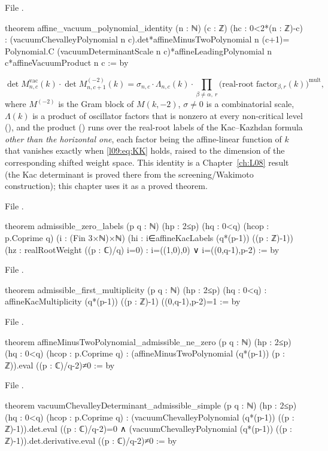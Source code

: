 \noindent File .
\begin{leancode}
theorem affine_vacuum_polynomial_identity (n : ℕ) (c : ℤ)
    (hc : 0<2*(n : ℤ)-c) :
    (vacuumChevalleyPolynomial n c).det*affineMinusTwoPolynomial n (c+1)=
      Polynomial.C (vacuumDeterminantScale n c)*affineLeadingPolynomial n c*affineVacuumProduct n c := by
\end{leancode}
\begin{equation}\label{l09:eq:detidentity}
  \det M^{\mathrm{vac}}_{n,c}(k)\cdot \det M^{(-2)}_{n,c+1}(k)
  = \sigma_{n,c}\cdot \Lambda_{n,c}(k)\cdot \prod_{\beta\ne\alpha,\ r}\bigl(\text{real-root factor}_{\beta,r}(k)\bigr)^{\mathrm{mult}} ,
\end{equation}
where $M^{(-2)}$ is the Gram block of $M(k,-2)$, $\sigma\neq0$ is a combinatorial scale, $\Lambda(k)$ is a
product of oscillator factors that is nonzero at every non-critical level
(), and the product () runs over
the real-root labels of the Kac--Kazhdan formula \emph{other than the horizontal one}, each factor
being the affine-linear function of $k$ that vanishes exactly when \eqref{l09:eq:KK} holds, raised to
the dimension of the corresponding shifted weight space. This identity is a Chapter~\ref{ch:L08}
result (the Kac determinant is proved there from the screening/Wakimoto construction); this chapter
uses it as a proved theorem.

\noindent File .
\begin{leancode}
theorem admissible_zero_labels (p q : ℕ) (hp : 2≤p) (hq : 0<q)
    (hcop : p.Coprime q) (i : (Fin 3×ℕ)×ℕ)
    (hi : i∈affineKacLabels (q*(p-1)) ((p : ℤ)-1))
    (hz : realRootWeight ((p : ℂ)/q) i=0) :
    i=((1,0),0) ∨ i=((0,q-1),p-2) := by
\end{leancode}
\noindent File .
\begin{leancode}
theorem admissible_first_multiplicity (p q : ℕ) (hp : 2≤p) (hq : 0<q) :
    affineKacMultiplicity (q*(p-1)) ((p : ℤ)-1) ((0,q-1),p-2)=1 := by
\end{leancode}
\noindent File .
\begin{leancode}
theorem affineMinusTwoPolynomial_admissible_ne_zero (p q : ℕ) (hp : 2≤p) (hq : 0<q)
    (hcop : p.Coprime q) :
    (affineMinusTwoPolynomial (q*(p-1)) (p : ℤ)).eval ((p : ℂ)/q-2)≠0 := by
\end{leancode}
\noindent File .
\begin{leancode}
theorem vacuumChevalleyDeterminant_admissible_simple (p q : ℕ) (hp : 2≤p) (hq : 0<q)
    (hcop : p.Coprime q) :
    (vacuumChevalleyPolynomial (q*(p-1)) ((p : ℤ)-1)).det.eval ((p : ℂ)/q-2)=0 ∧
    (vacuumChevalleyPolynomial (q*(p-1)) ((p : ℤ)-1)).det.derivative.eval ((p : ℂ)/q-2)≠0 := by
\end{leancode}

